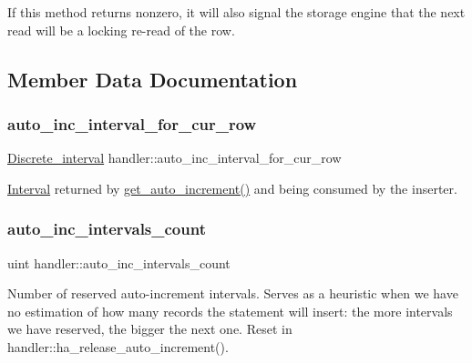 If this method returns nonzero, it will also signal the storage engine that the next read will be a locking re-\/read of the row. 

\subsection{Member Data Documentation}
\mbox{\label{classhandler_a1540a47a05c03724f1102aaaa623131e}} 
\subsubsection{\texorpdfstring{auto\+\_\+inc\+\_\+interval\+\_\+for\+\_\+cur\+\_\+row}{auto\_inc\_interval\_for\_cur\_row}}
{\footnotesize\ttfamily \mbox{\hyperlink{classDiscrete__interval}{Discrete\+\_\+interval}} handler\+::auto\+\_\+inc\+\_\+interval\+\_\+for\+\_\+cur\+\_\+row}

\mbox{\hyperlink{structInterval}{Interval}} returned by \mbox{\hyperlink{classhandler_aaf6af760a4ef09984a5cc1dc58db9a40}{get\+\_\+auto\+\_\+increment()}} and being consumed by the inserter. \mbox{\label{classhandler_acdfcef0738a89138c8f41ded8da17c0a}} 
\subsubsection{\texorpdfstring{auto\+\_\+inc\+\_\+intervals\+\_\+count}{auto\_inc\_intervals\_count}}
{\footnotesize\ttfamily uint handler\+::auto\+\_\+inc\+\_\+intervals\+\_\+count}

Number of reserved auto-\/increment intervals. Serves as a heuristic when we have no estimation of how many records the statement will insert\+: the more intervals we have reserved, the bigger the next one. Reset in handler\+::ha\+\_\+release\+\_\+auto\+\_\+increment(). \mbox{\label{classhandler_a05dd2cafd83ae60562649bf9688aebf1}} 
